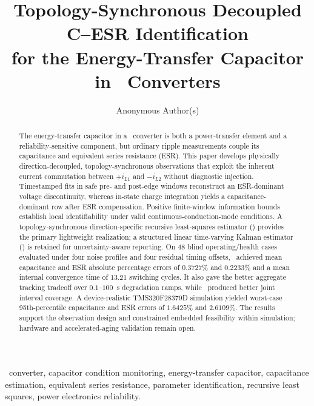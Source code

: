 \documentclass[journal]{IEEEtran}
\title{Topology-Synchronous Decoupled C--ESR Identification\\
for the Energy-Transfer Capacitor in \Cuk\ Converters}
\author{Anonymous Author(s)}
\begin{document}
\maketitle

\begin{abstract}
The energy-transfer capacitor in a \Cuk\ converter is both a power-transfer element and a reliability-sensitive component, but ordinary ripple measurements couple its capacitance and equivalent series resistance (ESR). This paper develops physically direction-decoupled, topology-synchronous observations that exploit the inherent current commutation between $+i_{L1}$ and $-i_{L2}$ without diagnostic injection. Timestamped fits in safe pre- and post-edge windows reconstruct an ESR-dominant voltage discontinuity, whereas in-state charge integration yields a capacitance-dominant row after ESR compensation. Positive finite-window information bounds establish local identifiability under valid continuous-conduction-mode conditions. A topology-synchronous direction-specific recursive least-squares estimator (\TSRLS) provides the primary lightweight realization; a structured linear time-varying Kalman estimator (\TSKF) is retained for uncertainty-aware reporting. On 48 blind operating/health cases evaluated under four noise profiles and four residual timing offsets, \TSRLS\ achieved mean capacitance and ESR absolute percentage errors of $0.3727\%$ and $0.2233\%$ and a mean internal convergence time of $13.21$ switching cycles. It also gave the better aggregate tracking tradeoff over $0.1$--$100$~s degradation ramps, while \TSKF\ produced better joint interval coverage. A device-realistic TMS320F28379D simulation yielded worst-case 95th-percentile capacitance and ESR errors of $1.6425\%$ and $2.6109\%$. The results support the observation design and constrained embedded feasibility within simulation; hardware and accelerated-aging validation remain open.
\end{abstract}

\begin{IEEEkeywords}
\Cuk\ converter, capacitor condition monitoring, energy-transfer capacitor, capacitance estimation, equivalent series resistance, parameter identification, recursive least squares, power electronics reliability.
\end{IEEEkeywords}












\appendices





\end{document}

